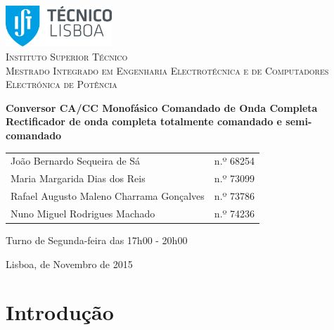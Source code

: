 \documentclass[a4paper,11pt]{article}
\numberwithin{equation}{section}
\begin{document}
\begin{titlepage}
\begin{center}

\hfill \break
\hfill \break

\includegraphics[width=0.3\textwidth]{img/logo}~\\[1cm] 

\textsc{\LARGE Instituto Superior Técnico}\\[0.25cm]
\textsc{\Large Mestrado Integrado em Engenharia Electrotécnica e de Computadores}\\[1.8cm]
\textsc{\huge Electrónica de Potência}\\[0.25cm]

\vspace{6mm}

{\huge \bfseries Conversor CA/CC Monofásico \linebreak Comandado de Onda Completa \\[0.7cm]}
{\bfseries Rectificador de onda completa totalmente comandado e semi-comandado \\[1cm]}

\begin{tabular}{ l l }
	João Bernardo Sequeira de Sá & \hspace{2mm} n.º 68254 \\
	Maria Margarida Dias dos Reis & \hspace{2mm} n.º 73099 \\
	Rafael Augusto Maleno Charrama Gonçalves & \hspace{2mm} n.º 73786 \\
	Nuno Miguel Rodrigues Machado & \hspace{2mm} n.º 74236
\end{tabular}

\vspace{7mm}

Turno de Segunda-feira das 17h00 - 20h00

\vfill

{\large Lisboa,  de Novembro de 2015} 
	
\end{center}
\end{titlepage}
	
\tableofcontents
\pagebreak

\section{Introdução}
\end{document}
